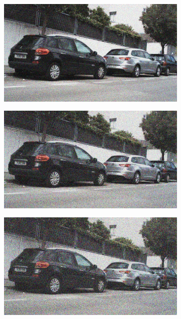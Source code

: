 \documentclass[a4paper]{ctexart}
\begin{document}
\begin{figure}[htbp]
\begin{subfigure}{0.08\textwidth}
				\label{fig：Gamma=0.6, Gauss Noise = 0.1}
			\end{subfigure}
			\begin{subfigure}{0.08\textwidth}
				\captionsetup{font=scriptsize}
				\includegraphics[width=\linewidth]{picture/Edge Detection/degrade/RGB_001 Gamma=0.6, Gauss Noise=0.2}
				\label{fig：Gamma=0.6, Gauss Noise = 0.2}
			\end{subfigure}
			\begin{subfigure}{0.08\textwidth}
				\captionsetup{font=scriptsize}
				\includegraphics[width=\linewidth]{picture/Edge Detection/degrade/RGB_001 Gamma=0.6, Gauss Noise=0.3}
				\label{fig：Gamma=0.6, Gauss Noise = 0.3}
			\end{subfigure}
			\begin{subfigure}{0.08\textwidth}
				\captionsetup{font=scriptsize}
				\includegraphics[width=\linewidth]{picture/Edge Detection/degrade/RGB_001 Gamma=0.6, Gauss Noise=0.4}

\end{subfigure}
\end{figure}
\end{document}
